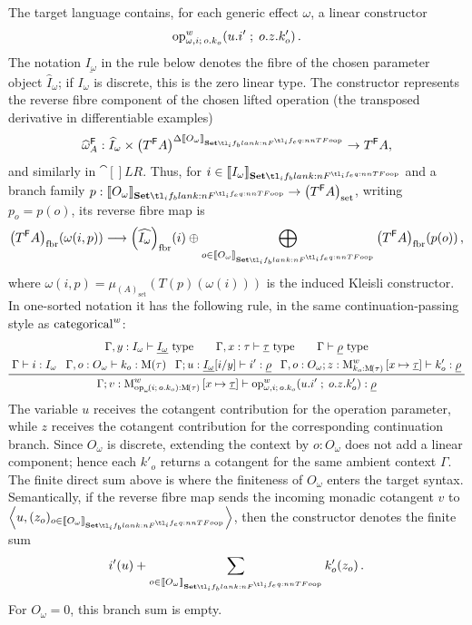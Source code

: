 \documentclass[11pt,a4paper]{article}
\theoremstyle{definition}
\theoremstyle{remark}
\providecommand{\casubst}[3]{#1[#3/#2]}
\providecommand{\base}[1]{\left(#1\right)_{\mathrm{set}}}
\providecommand{\fibr}[1]{\left(#1\right)_{\mathrm{fbr}}}
\providecommand{\lintype}[1]{\underline{#1}}
\providecommand{\setint}[1]{\llbracket #1\rrbracket_{\Set}}
\begin{document}
The target language contains, for each generic effect \(\omega\), a linear
constructor
\[
  \fn[n]{\opn[b]{op}^{w}_{\omega,i;\,o.k_o}}{
    u.i' \; ; \; o.z.k'_o
  } .
\]
The notation \(\lintype{I_\omega}\) in the rule below denotes the fibre of the
chosen parameter object \(\widehat I_\omega\); if \(I_\omega\) is discrete, this
is the zero linear type.  The constructor represents the reverse fibre component
of the chosen lifted operation (the transposed derivative in differentiable examples)
\[
  \widehat\omega^{\cat[]{F}}_A:
  \widehat I_{\omega}\times
  \left(T^{\cat[]{F}}A\right)^{\Delta\setint{O_{\omega}}}
  \to
  T^{\cat[]{F}}A,
\]
and similarly in \(\cat[]{LR}\).  Thus, for
\(i\in\setint{I_\omega}\) and a branch family
\(p:\setint{O_\omega}\to\base{T^{\cat[]{F}}A}\), writing \(p_o=p(o)\), its reverse fibre map is
\[
  \Fun[np]{\fibr{ T^{\cat[]{F}}A }}{\omega(i,p)}
  \longrightarrow
  \Fun[np]{\fibr{ \widehat{ I_\omega } }}{i}
  \oplus
  \bigoplus_{o\in\setint{O_\omega}}
  \Fun[np]{\fibr{ T^{\cat[]{F}}A }}{p(o)},
\]
where \(\omega(i,p)=\mu_{\base{A}}(T(p)(\omega(i)))\) is the induced Kleisli constructor.  In
one-sorted notation it has the following rule, in the same continuation-passing
style as \(\opn[b]{categorical}^{w}\):
\begin{equation}
  \label{eq:appendix-generic-operation-w-typing}
  \begin{gathered}
    \Gamma,y:I_{\omega}\vdash \lintype{I_{\omega}} \text{ type}
    \qquad
    \Gamma,x:\tau\vdash \lintype{\tau} \text{ type}
    \qquad
    \Gamma\vdash \lintype{\rho} \text{ type}
    \\
    \prftree{
      \Gamma\vdash i:I_{\omega}
    }{
      \Gamma,o:O_{\omega}\vdash k_o:\Fun[nn]{\opn[b]{M}}{\tau}
    }{
      \Gamma;u:\casubst{\lintype{I_{\omega}}}{y}{i}
      \vdash i':\lintype{\rho}
    }{
      \Gamma,o:O_{\omega};
      z:
      \opn[b]{M}^{w}_{k_o:\Fun[nn]{\opn[b]{M}}{\tau}}
      \left[x\mapsto \lintype{\tau}\right]
      \vdash k'_o:\lintype{\rho}
    }{
      \Gamma;
      v:
      \opn[b]{M}^{w}_{
        \fn[n]{\opn[b]{op}_{\omega}}{i;\,o.k_o}
        :
        \Fun[nn]{\opn[b]{M}}{\tau}
      }
      \left[x\mapsto \lintype{\tau}\right]
      \vdash
      \fn[n]{\opn[b]{op}^{w}_{\omega,i;\,o.k_o}}{
        u.i' \; ; \; o.z.k'_o
      }
      :
      \lintype{\rho}
    }
  \end{gathered}
\end{equation}
The variable \(u\) receives the cotangent contribution for the operation
parameter, while \(z\) receives the cotangent contribution for the corresponding
continuation branch.  Since \(O_{\omega}\) is discrete, extending the context by
\(o:O_{\omega}\) does not add a linear component; hence each \(k'_o\) returns a
cotangent for the same ambient context \(\Gamma\).  The finite direct sum above
is where the finiteness of \(O_{\omega}\) enters the target syntax.
Semantically, if the reverse fibre map sends the incoming monadic cotangent \(v\) to
\(\tuple{u,(z_o)_{o\in\setint{O_{\omega}}}}\), then the constructor denotes the finite sum
\[
  \fn[n]{i'}{u}
  +
  \sum_{o\in\setint{O_{\omega}}}
  \fn[n]{k'_o}{z_o}.
\]
For \(O_{\omega}=0\), this branch sum is empty.
\end{document}
